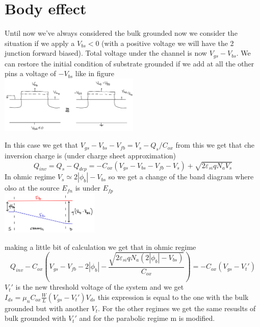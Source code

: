 \section{Body effect}
Until now we've always considered the bulk grounded now we consider the situation if we apply a $V_{bs}<0$ (with a positive voltage we will have the 2 junction forward biased). Total voltage under the channel is now $V_{gs}-V_{bs}$. We can restore the initial condition of substrate grounded if we add at all the other pins a voltage of $-V_{bs}$ like in figure\\

\centering
\includegraphics[width=0.5\textwidth]{body1.png}\\
\raggedright

In this case we get that $V_{gs}-V_{bs}-V_{fb}=V_s-Q_s/C_{ox}$ from this we get that che inversion charge is (under charge sheet approximation) 
\begin{equation}
Q_{inv}=Q_s-Q_{dep}=-C_{ox}(V_{gs}-V_{bs}-V_{fb}-V_s)+\sqrt{2\varepsilon_{si}qN_aV_s}
\end{equation}
In ohmic regime $V_s\simeq 2|\phi_b|-V_{bs}$ so we get a change of the band diagram where olso at the source $E_{fn}$ is under $E_{fp}$ \\

\centering
\includegraphics[width=0.35\textwidth]{body2.png}\\
\raggedright

making a little bit of calculation we get that in ohmic regime
\begin{equation}
Q_{inv}-C_{ox}(V_{gs}-V_{fb}-2|\phi_b|-\frac{\sqrt{2\varepsilon_{si}qN_a(2|\phi_b|-V_{bs})}}{C_{ox}})=-C_{ox}(V_{gs}-V_t')
\end{equation}
$V_t'$ is the new threshold voltage of the system and we get $I_{ds}=\mu_nC_{ox}\frac{W}{L}(V_{gs}-V_t')V_{ds}$ this expression is equal to the one with the bulk grounded but with another $V_t$. For the other regimes we get the same resuslts of bulk grounded with $V_t'$ and for the parabolic regime m is modified.\\

